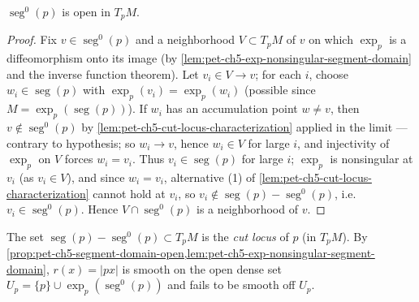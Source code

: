 \begin{proposition}
  \label{prop:pet-ch5-segment-domain-open}
  $\operatorname{seg}^0(p)$ is open in $T_pM$.
\end{proposition}
\begin{proof}
  Fix $v\in\operatorname{seg}^0(p)$ and a neighborhood $V\subset T_pM$ of $v$ on
  which $\exp_p$ is a diffeomorphism onto its image (by
  \cref{lem:pet-ch5-exp-nonsingular-segment-domain} and the inverse function
  theorem). Let $v_i\in V\to v$; for each $i$, choose $w_i\in\operatorname{seg}(p)$
  with $\exp_p(v_i)=\exp_p(w_i)$ (possible since $M=\exp_p(\operatorname{seg}(p))$).
  If $w_i$ has an accumulation point $w\ne v$, then $v\notin\operatorname{seg}^0(p)$
  by \cref{lem:pet-ch5-cut-locus-characterization} applied in the limit — contrary
  to hypothesis; so $w_i\to v$, hence $w_i\in V$ for large $i$, and injectivity of
  $\exp_p$ on $V$ forces $w_i=v_i$. Thus $v_i\in\operatorname{seg}(p)$ for large
  $i$; $\exp_p$ is nonsingular at $v_i$ (as $v_i\in V$), and since $w_i=v_i$,
  alternative (1) of \cref{lem:pet-ch5-cut-locus-characterization} cannot hold at
  $v_i$, so $v_i\notin\operatorname{seg}(p)-\operatorname{seg}^0(p)$, i.e.\
  $v_i\in\operatorname{seg}^0(p)$. Hence $V\cap\operatorname{seg}^0(p)$ is a
  neighborhood of $v$.
\end{proof}

\begin{definition}
  \label{def:pet-ch5-cut-locus}
  The set $\operatorname{seg}(p)-\operatorname{seg}^0(p)\subset T_pM$ is the
  \emph{cut locus} of $p$ (in $T_pM$). By
  \cref{prop:pet-ch5-segment-domain-open,lem:pet-ch5-exp-nonsingular-segment-domain},
  $r(x)=|px|$ is smooth on the open dense set $U_p=\{p\}\cup\exp_p(\operatorname{seg}^0(p))$
  and fails to be smooth off $U_p$.
\end{definition}

